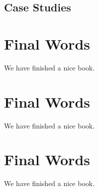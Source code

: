 \documentclass[]{book}
\theoremstyle{definition}
\theoremstyle{definition}
\theoremstyle{definition}
\theoremstyle{remark}
\begin{document}
\hypertarget{case-studies-2}{%
\section{Case Studies}\label{case-studies-2}}

\hypertarget{final-words}{%
\chapter{Final Words}\label{final-words}}

We have finished a nice book.

\hypertarget{final-words-1}{%
\chapter{Final Words}\label{final-words-1}}

We have finished a nice book.

\hypertarget{final-words-2}{%
\chapter{Final Words}\label{final-words-2}}

We have finished a nice book.


\end{document}

